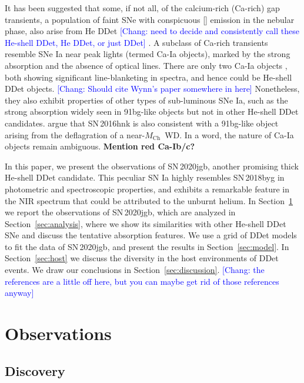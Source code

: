 \documentclass[twocolumn]{aastex631}
\newcommand{\sn}{SN\,2020jgb}
\newcommand{\Mch}{$M_\mathrm{Ch}$}
\newcommand{\chang}[1]{\textcolor{blue}{[Chang: #1]}}
\begin{document}
It has been suggested that some, if not all, of the calcium-rich (Ca-rich) gap transients, a population of faint SNe with conspicuous [] emission in the nebular phase, also arise from He DDet \chang{need to decide and consistently call these He-shell DDet, He DDet, or just DDet} \citep{Dessart_2015,de_Ca_rich_2020,polin_nebular_2021}. A subclass of Ca-rich transients resemble SNe Ia near peak lights (termed Ca-Ia objects), marked by the strong  absorption and the absence of optical  lines. There are only two Ca-Ia objects \citep[SN\,2016hnk and SN\,2019ofm;][]{de_Ca_rich_2020}, both showing significant line-blanketing in spectra, and hence could be He-shell DDet objects. \chang{Should cite Wynn's paper somewhere in here} Nonetheless, they also exhibit properties of other types of sub-luminous SNe Ia, such as the strong  absorption widely seen in 91bg-like objects \citep{Filippenko_91bg_1992} but not in other He-shell DDet candidates. \citet{galbany_16hnk_2019} argue that SN\,2016hnk is also consistent with a 91bg-like object arising from the deflagration of a near-\Mch\ WD. In a word, the nature of Ca-Ia objects remain ambiguous. \textbf{Mention red Ca-Ib/c?}


In this paper, we present the observations of \sn, another promising thick He-shell DDet candidate. This peculiar SN Ia highly resembles SN\,2018byg in photometric and spectroscopic properties, and exhibits a remarkable feature in the NIR spectrum that could be attributed to the unburnt helium. In Section~\ref{sec:obs} we report the observations of \sn, which are analyzed in Section~\ref{sec:analysis}, where we show its similarities with other He-shell DDet SNe and discuss the tentative  absorption features. We use a grid of DDet models to fit the data of \sn, and present the results in Section~\ref{sec:model}. In Section~\ref{sec:host} we discuss the diversity in the host environments of DDet events. We draw our conclusions in Section~\ref{sec:discussion}. \chang{the references are a little off here, but you can maybe get rid of those references anyway}

\section{Observations} \label{sec:obs}
\subsection{Discovery}
\end{document}
